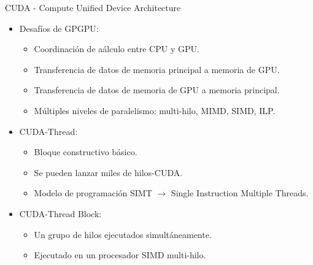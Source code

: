 \begin{frame}[t]{CUDA - Compute Unified Device Architecture}
\begin{itemize}
  \item Desafíos de GPGPU:
    \begin{itemize}
      \item Coordinación de aálculo entre CPU y GPU.
      \item Transferencia de datos de memoria principal a memoria de GPU.
      \item Transferencia de datos de memoria de GPU a memoria principal.
      \item Múltiples niveles de paralelismo: multi-hilo, MIMD, SIMD, ILP.
    \end{itemize}

  \item CUDA-Thread:
    \begin{itemize}
      \item Bloque constructivo básico.
      \item Se pueden lanzar miles de hilos-CUDA.
      \item Modelo de programación SIMT $\rightarrow$ Single Instruction Multiple Threads.
    \end{itemize}

  \item CUDA-Thread Block:
    \begin{itemize}
      \item Un grupo de hilos ejecutados simultáneamente.
      \item Ejecutado en un procesador SIMD multi-hilo.
    \end{itemize}
\end{itemize}
\end{frame}

